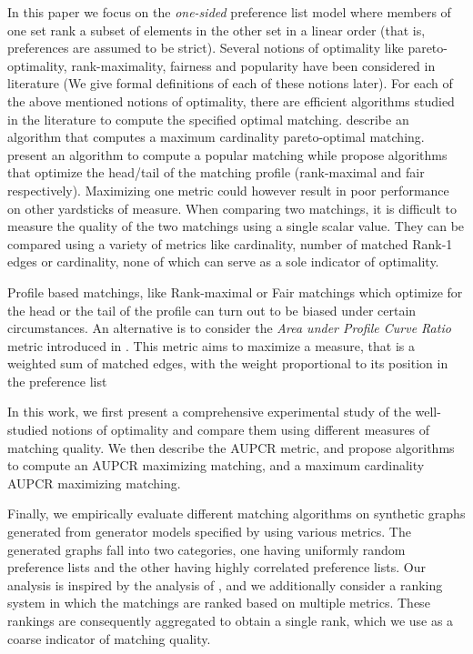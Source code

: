\documentclass[letterpaper]{article} %
\begin{document}
In this paper we focus on the {\em one-sided} preference list model where members of one set rank  a subset of  elements in the other set in a linear order (that is, preferences are assumed to be strict). Several notions of optimality like pareto-optimality, rank-maximality, fairness and popularity have been considered in literature (We give formal definitions of each of these notions later). For each of the above mentioned notions of optimality, there are efficient algorithms studied in the literature to compute the specified optimal matching. \cite{pareto} describe an algorithm that computes a maximum cardinality pareto-optimal matching. \cite{pop-main} present an algorithm to compute a popular matching while \cite{irving2004rank,fair} propose algorithms that optimize the head/tail of the matching profile (rank-maximal and fair respectively). Maximizing one metric could however result in poor performance on other yardsticks of measure. When comparing two matchings, it is difficult to measure the quality of the two matchings using a single scalar value. They can be compared using a variety of metrics like cardinality, number of matched Rank-1 edges or cardinality, none of which can serve as a sole indicator of optimality.

Profile based matchings, like Rank-maximal or Fair matchings which optimize for the head or the tail of the profile can turn out to be biased under certain circumstances. An alternative is to consider the \textit{Area under Profile Curve Ratio} metric introduced in \cite{experiment2}. This metric aims to maximize a measure, that is a weighted sum of matched edges, with the weight proportional to its position in the preference list

In this work, we first present a comprehensive experimental study of the well-studied notions of optimality and compare them using different measures of matching quality. We then describe the AUPCR metric, and propose algorithms to compute an AUPCR maximizing matching, and a maximum cardinality AUPCR maximizing matching.

Finally, we empirically evaluate different matching algorithms on synthetic graphs generated from generator models specified by \cite{experimental} using various metrics. The generated graphs fall into two categories, one having uniformly random preference lists and the other having highly correlated preference lists. Our analysis is inspired by the analysis of \cite{experimental}, and we additionally consider a ranking system in which the matchings are ranked based on multiple metrics. These rankings are consequently aggregated to obtain a single rank, which we use as a coarse indicator of matching quality.
\end{document}
